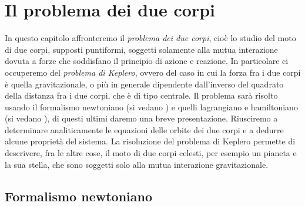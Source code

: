 \chapter{Il problema dei due corpi}
\label{chap:due-corpi}

In questo capitolo affronteremo il \emph{problema dei due corpi}, cioè lo studio
del moto di due corpi, supposti puntiformi, soggetti solamente alla mutua
interazione dovuta a forze che soddisfano il principio di azione e reazione. In
particolare ci occuperemo del \emph{problema di Keplero}, ovvero del caso in cui
la forza fra i due corpi è quella gravitazionale, o più in generale dipendente
dall'inverso del quadrato della distanza fra i due corpi, che è di tipo
centrale. Il problema sarà risolto usando il formalismo newtoniano (si vedano
\textcites{bradt:processes}{fabrizio:meccanica}{smart:textbook}) e quelli
lagrangiano e hamiltoniano (si vedano
\textcites{goldstein:meccanica}{landau:meccanica}), di questi ultimi daremo una
breve presentazione. Riusciremo a determinare analiticamente le equazioni delle
orbite dei due corpi e a dedurre alcune proprietà del sistema. La risoluzione
del problema di Keplero permette di descrivere, fra le altre cose, il moto di
due corpi celesti, per esempio un pianeta e la sua stella, che sono soggetti
solo alla mutua interazione gravitazionale.

\section{Formalismo newtoniano}
\label{sec:formalismo-newton}

